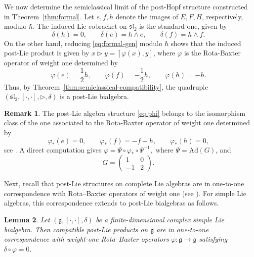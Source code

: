\documentclass[11pt,english]{article}
\newcommand{\tri}{\mathbin{\triangleright}}
\newtheorem{lemma}{Lemma}
\theoremstyle{definition}
\newtheorem{remark}[lemma]{Remark}
\begin{document}
We now determine the semiclassical limit of the
post-Hopf structure constructed in
Theorem~\ref{thm:formal}.
Let $e,f,h$ denote the images of $E,F,H$,
respectively, modulo $\hbar$.
The induced Lie cobracket on $\mathfrak{sl}_2$
is the standard one, given by
\begin{equation}\label{eq:sl2-cobracket}
\delta(h)=0,\qquad
\delta(e)=h\wedge e,\qquad
\delta(f)=h\wedge f.
\end{equation}
On the other hand, reducing
\eqref{eq:formal-gen} modulo $\hbar$
shows that the induced post-Lie product
is given by $x\tri y=[\varphi(x),y]$, where $\varphi$ is the Rota-Baxter operator of weight one determined by
\begin{equation}\label{eq:phi}
\varphi(e)=\frac12h,\qquad
\varphi(f)=-\frac12h,\qquad
\varphi(h)=-h.
\end{equation}
Thus, by
Theorem~\ref{thm:semiclassical-compatibility},
the quadruple
$(\mathfrak{sl}_2,[\cdot,\cdot],\tri,\delta)$
is a post-Lie bialgebra.
\begin{remark}
The post-Lie algebra structure \eqref{eq:phi}
belongs to the 
isomorphism class of the one associated to the Rota-Baxter operator of weight one determined by
\[
\varphi_*(e)=0,\qquad
\varphi_*(f)=-f-h,\qquad
\varphi_*(h)=0,
\]
see \cite[Subsection~1.1.2]{RSW}.
A direct computation gives $\varphi=\Psi \circ \varphi_* \circ\Psi^{-1},$ where $\Psi = \mathrm{Ad}(G)$, and
\[
G=
\begin{pmatrix}
1&0\\
-1&2
\end{pmatrix}.
\]
\end{remark}

Next, recall that post-Lie structures on complete Lie
algebras are in one-to-one correspondence with
Rota--Baxter operators of weight one
(see \cite[Remark~3]{RSW}).
For simple Lie algebras, this correspondence
extends to post-Lie bialgebras as follows.

\begin{lemma}\label{lem:rb}
Let $(\mathfrak g,[\cdot,\cdot],\delta)$ be a
finite-dimensional complex simple Lie bialgebra.
Then compatible post-Lie products on
$\mathfrak g$ are in one-to-one correspondence
with weight-one Rota--Baxter operators
$\varphi:\mathfrak g\to\mathfrak g$
satisfying $\delta\circ\varphi=0$.
\end{lemma}
\end{document}
